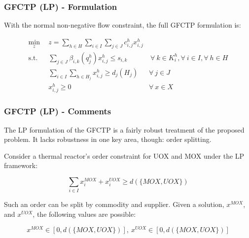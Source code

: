 \begin{frame}[ctb!]
  \frametitle{GFCTP (LP) - Formulation} 

  With the normal non-negative flow constraint, the full GFCTP formulation is:
  
  \begin{subequations}\label{eqs:GFCTP-LP}
    \begin{align}
      \min_{z} \:\: & 
      z = \sum_{h \in H}\sum_{i \in I}\sum_{j \in J}c_{i,j}^{h} x_{i,j}^{h} 
      & \label{eqs:GFCTP-LP_obj} \\
      \text{s.t.} \:\: &
      \sum_{j \in J}\beta_{i,k}(q_{j}^{h}) x_{i,j}^{h} \leq s_{i,k} 
      &
      \: \forall \: k \in K_{i}^{h},  
      \forall \: i \in I, \forall \: h \in H \label{eqs:GFCTP-LP_sup} \\
      &
      \sum_{i \in I}\sum_{h \in H_{j}} x_{i,j}^{h} \geq d_{j}(H_{j}) 
      & 
      \forall \: j \in J \label{eqs:GFCTP-LP_dem} \\
      &
      x^h_{i,j} \geq 0
      &
      \forall \: x \in X \label{eqs:GFCTP-LP_x}
    \end{align}
  \end{subequations}
\end{frame}

\begin{frame}[ctb!]
  \frametitle{GFCTP (LP) - Comments} 

  The LP formulation of the GFCTP is a fairly robust treatment of the proposed
  problem. It lacks robustness in one key area, though: order splitting.\vspace{0.2cm}

  Consider a thermal reactor's order constraint for UOX and MOX under the LP
  framework:

  \begin{equation}
    \sum_{i \in I} x_{i}^{MOX} + x_{i}^{UOX} \geq d(\{MOX,UOX\})
  \end{equation} 

  Such an order can be split by commodity and supplier. Given a solution,
  $x^{MOX}$, and $x^{UOX}$, the following values are possible:

  \begin{equation}
    x^{MOX} \in [0, d(\{MOX,UOX\})], \: x^{UOX} \in [0, d(\{MOX,UOX\})]
  \end{equation} 

\end{frame}

